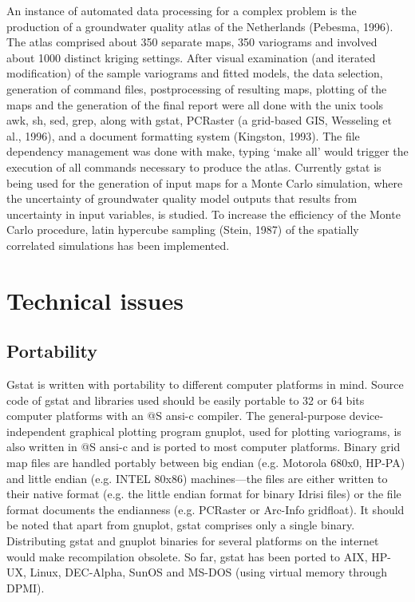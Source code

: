 \documentclass{article}
\begin{document}
An instance of automated data processing for a complex problem is the
production of a groundwater quality atlas of the Netherlands (Pebesma,
1996). The atlas comprised about 350 separate maps, 350 variograms and
involved about 1000 distinct kriging settings. After visual examination
(and iterated modification) of the sample variograms and fitted models,
the data selection, generation of command files, postprocessing of
resulting maps, plotting of the maps and the generation of the final
report were all done with the unix tools awk, sh, sed, grep, along
with gstat, PCRaster (a grid-based GIS, Wesseling et al., 1996), and a
document formatting system (Kingston, 1993). The file dependency
management was done with make, typing `make all' would trigger the
execution of all commands necessary to produce the atlas. Currently
gstat is being used for the generation of input maps for a Monte Carlo
simulation, where the uncertainty of groundwater quality model outputs
that results from uncertainty in input variables, is studied. To
increase the efficiency of the Monte Carlo procedure, latin hypercube
sampling (Stein, 1987) of the spatially correlated simulations has been
implemented.

\section{ Technical issues }

\subsection{Portability}
Gstat is written with portability to different computer platforms in
mind. Source code of gstat and libraries used should be easily portable
to 32 or 64 bits computer platforms with an @S ansi-c compiler.  The
general-purpose device-independent graphical plotting program gnuplot,
used for plotting variograms, is also written in @S ansi-c and is ported
to most computer platforms.  Binary grid map files are handled portably
between big endian (e.g. Motorola 680x0, HP-PA) and little endian (e.g.
INTEL 80x86) machines---the files are either written to their native
format (e.g. the little endian format for binary Idrisi files) or the
file format documents the endianness (e.g. PCRaster or Arc-Info
gridfloat). It should be noted that apart from gnuplot, gstat comprises
only a single binary. Distributing gstat and gnuplot binaries for
several platforms on the internet would make recompilation obsolete. So
far, gstat has been ported to AIX, HP-UX, Linux, DEC-Alpha, SunOS and
MS-DOS (using virtual memory through DPMI).
\end{document}
